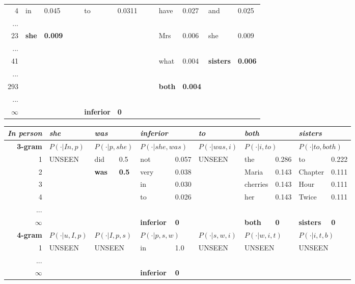 \documentclass[11pt,titlepage]{article}
\begin{document}
\begin{table}
\begin{tabular}{|rllllllllllll|}
4 & in & 0.045 & & & to & 0.0311 & & & have & 0.027 & and & 0.025 \\
... & & & & & & & & & & & & \\ 
23 & \textbf{she}  & \textbf{0.009} & & & & & & & Mrs & 0.006 & she & 0.009 \\ 
... & & & & & & & & & & & & \\ 
41 & & & & & & & & & what & 0.004 & \textbf{sisters} & \textbf{0.006} \\  
... & & & & & & & & & & & & \\ 
293 & & & & & & & & & \textbf{both} & \textbf{0.004} & & \\  
... & & & & & & & & & & & & \\ 
$\infty$  & & & & & \textbf{inferior} & \textbf{0}  & & & & & &  \\
\hline 
\end{tabular}
\end{table}

\begin{table}
\begin{tabular}{|rllllllllllll|}
\hline
\textit{In person} & \textit{she} & & \textit{was} & & \textit{inferior} & & \textit{to} & & \textit{both} & & \textit{sisters} & \\
\hline
\textbf{3-gram} & \multicolumn{2}{l}{$P(\cdot|In,p)$} & \multicolumn{2}{l}{$P(\cdot|p,she)$} & \multicolumn{2}{l}{$P(\cdot|she,was)$} & \multicolumn{2}{l}{$P(\cdot|was,i)$} & \multicolumn{2}{l}{$P(\cdot|i,to)$} & \multicolumn{2}{l|}{$P(\cdot|to,both)$}\\
1 & \multicolumn{2}{l}{UNSEEN} & did & 0.5 & not & 0.057 & \multicolumn{2}{l}{UNSEEN} & the & 0.286 & to & 0.222\\
2 & & & \textbf{was} & \textbf{0.5} & very & 0.038 & & & Maria & 0.143 & Chapter & 0.111\\
3 & & & & &  in & 0.030 & & &  cherries & 0.143 & Hour & 0.111 \\
4 & & & & & to & 0.026 & & & her & 0.143 & Twice & 0.111\\
... & & & & & & & & & & & & \\ 
$\infty$ & & & & & \textbf{inferior} & \textbf{0} & & & \textbf{both} & \textbf{0} & \textbf{sisters} & \textbf{0} \\
\hline
\textbf{4-gram} & \multicolumn{2}{l}{$P(\cdot|u,I,p)$} & \multicolumn{2}{l}{$P(\cdot|I,p,s)$} & \multicolumn{2}{l}{$P(\cdot|p,s,w)$} & \multicolumn{2}{l}{$P(\cdot|s,w,i)$} & \multicolumn{2}{l}{$P(\cdot|w,i,t)$} & \multicolumn{2}{l|}{$P(\cdot|i,t,b)$}\\
1 & \multicolumn{2}{l}{UNSEEN} & \multicolumn{2}{l}{UNSEEN} & in & 1.0 & \multicolumn{2}{l}{UNSEEN} & \multicolumn{2}{l}{UNSEEN} & \multicolumn{2}{l|}{UNSEEN} \\
... & & & & & & & & & & & & \\ 
$\infty$ & & & & & \textbf{inferior} & \textbf{0} & & & & & & \\
\hline
\end{tabular}
\end{table}
\end{document}
